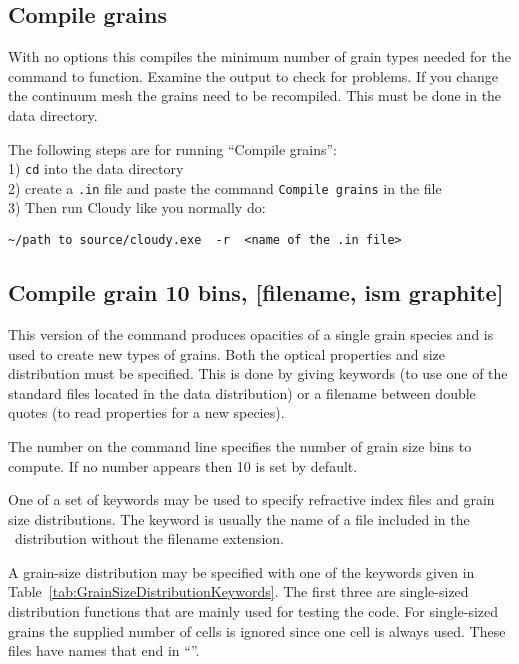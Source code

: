 \subsection{Compile grains}

With no options this compiles the minimum number of grain types needed
for the  command to function.
Examine the output to check
for problems. If you change the continuum mesh the grains need to be recompiled. 
This must be done in the data directory.

The following steps are for running “Compile grains”:\\
1) \texttt{cd} into the data directory\\
2) create a \texttt{.in} file and paste the command \texttt{Compile grains} in the file\\
3) Then run Cloudy like you normally do:
\begin{verbatim}
~/path to source/cloudy.exe  -r  <name of the .in file>
\end{verbatim}

\subsection{Compile grain 10 bins, [filename, ism graphite]}

This version of the command produces opacities of a single grain species
and is used to create new types of grains.
Both the optical properties
and size distribution must be specified.
This is done by giving keywords
(to use one of the standard files located in the data distribution)
or a filename between double quotes (to read properties for a new species).

The number on the command line specifies the number of
grain size bins to compute.
If no number appears then 10 is set by default.

One of a set of keywords may be used to
specify refractive index files and grain size distributions.
The keyword is usually the
name of a file included in the \Cloudy\ distribution
without the filename extension.

A grain-size
distribution may be specified with one of the keywords given in
Table~\ref{tab:GrainSizeDistributionKeywords}.
The first three are single-sized distribution functions that are mainly
used for testing the code.
For single-sized grains the supplied number
of cells is ignored since one cell is always used.
These files have names
that end in ``''.

